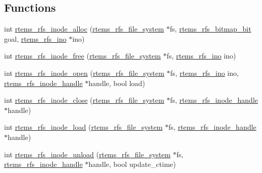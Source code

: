 \subsection*{Functions}
\begin{DoxyCompactItemize}
\item 
int \mbox{\hyperlink{rtems-rfs-inode_8c_a3debf4c8c9f9149e355abd82a1804e44}{rtems\+\_\+rfs\+\_\+inode\+\_\+alloc}} (\mbox{\hyperlink{struct__rtems__rfs__file__system}{rtems\+\_\+rfs\+\_\+file\+\_\+system}} $\ast$fs, \mbox{\hyperlink{rtems-rfs-bitmaps_8h_acc1b0aefe1b090890ccbc1b05279a78e}{rtems\+\_\+rfs\+\_\+bitmap\+\_\+bit}} goal, \mbox{\hyperlink{rtems-rfs-inode_8h_ae658325c3ff9941f2e68315d20e3c723}{rtems\+\_\+rfs\+\_\+ino}} $\ast$ino)
\item 
int \mbox{\hyperlink{rtems-rfs-inode_8c_a644fd4c2be2a40b4d9535d01f3279db2}{rtems\+\_\+rfs\+\_\+inode\+\_\+free}} (\mbox{\hyperlink{struct__rtems__rfs__file__system}{rtems\+\_\+rfs\+\_\+file\+\_\+system}} $\ast$fs, \mbox{\hyperlink{rtems-rfs-inode_8h_ae658325c3ff9941f2e68315d20e3c723}{rtems\+\_\+rfs\+\_\+ino}} ino)
\item 
int \mbox{\hyperlink{rtems-rfs-inode_8c_a3eaae78410d715b273bf1323bdd39a94}{rtems\+\_\+rfs\+\_\+inode\+\_\+open}} (\mbox{\hyperlink{struct__rtems__rfs__file__system}{rtems\+\_\+rfs\+\_\+file\+\_\+system}} $\ast$fs, \mbox{\hyperlink{rtems-rfs-inode_8h_ae658325c3ff9941f2e68315d20e3c723}{rtems\+\_\+rfs\+\_\+ino}} ino, \mbox{\hyperlink{rtems-rfs-inode_8h_a91f02dac5a2d91e072d676f3266ab8d2}{rtems\+\_\+rfs\+\_\+inode\+\_\+handle}} $\ast$handle, bool load)
\item 
int \mbox{\hyperlink{rtems-rfs-inode_8c_a59a67f021dd8d2257d44145f170afbc4}{rtems\+\_\+rfs\+\_\+inode\+\_\+close}} (\mbox{\hyperlink{struct__rtems__rfs__file__system}{rtems\+\_\+rfs\+\_\+file\+\_\+system}} $\ast$fs, \mbox{\hyperlink{rtems-rfs-inode_8h_a91f02dac5a2d91e072d676f3266ab8d2}{rtems\+\_\+rfs\+\_\+inode\+\_\+handle}} $\ast$handle)
\item 
int \mbox{\hyperlink{rtems-rfs-inode_8c_ab22829804234411322af37285e692832}{rtems\+\_\+rfs\+\_\+inode\+\_\+load}} (\mbox{\hyperlink{struct__rtems__rfs__file__system}{rtems\+\_\+rfs\+\_\+file\+\_\+system}} $\ast$fs, \mbox{\hyperlink{rtems-rfs-inode_8h_a91f02dac5a2d91e072d676f3266ab8d2}{rtems\+\_\+rfs\+\_\+inode\+\_\+handle}} $\ast$handle)
\item 
int \mbox{\hyperlink{rtems-rfs-inode_8c_abeaf719d26450cda93c1111d93aaadea}{rtems\+\_\+rfs\+\_\+inode\+\_\+unload}} (\mbox{\hyperlink{struct__rtems__rfs__file__system}{rtems\+\_\+rfs\+\_\+file\+\_\+system}} $\ast$fs, \mbox{\hyperlink{rtems-rfs-inode_8h_a91f02dac5a2d91e072d676f3266ab8d2}{rtems\+\_\+rfs\+\_\+inode\+\_\+handle}} $\ast$handle, bool update\+\_\+ctime)

\end{DoxyCompactItemize}

